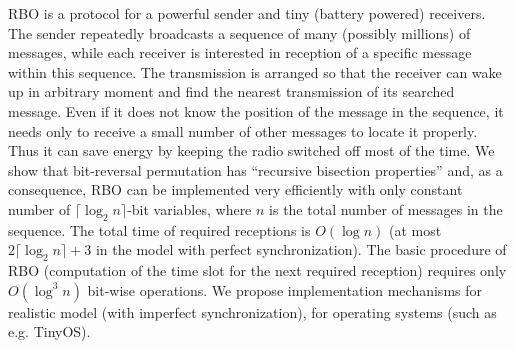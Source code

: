 RBO is a protocol for a powerful sender and tiny (battery powered) receivers.
The sender repeatedly broadcasts a sequence of many (possibly millions) of messages,
while each receiver is interested in reception of a specific message within this
sequence.
The transmission is arranged so that the receiver can wake up in arbitrary moment and find
 the nearest transmission of its searched message.  
Even if it does not know the position of the message in the sequence,
it needs only
to receive a small number of other messages to locate it properly.
Thus it can save energy by keeping the radio switched off most of the time.
We show that bit-reversal permutation has ``recursive bisection properties''
and, as a consequence,
RBO can be implemented very efficiently 
with only constant number of $\lceil\log_2 n\rceil$-bit variables,
where $n$ is the total number of messages in the sequence. 
The total time of required receptions is $O(\log n)$
(at most $2\lceil\log_2 n\rceil+3$ in the model with perfect synchronization).
The basic procedure of RBO 
(computation of the time slot for the next required reception)
requires only $O(\log^3 n)$ bit-wise operations.
We propose implementation mechanisms 
for realistic model (with imperfect synchronization),
for operating systems (such as e.g. TinyOS).
